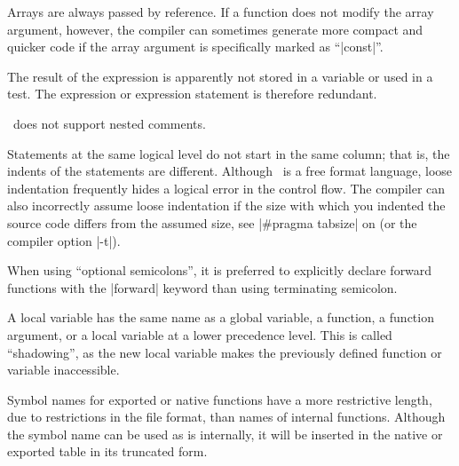 {{ 
        Arrays are always passed by reference. If a function does not modify
        the array argument, however, the compiler can sometimes generate more
        compact and quicker code if the array argument is specifically marked
        as ``|const|''.

 
        The result of the expression is apparently not stored in a variable
        or used in a test. The expression or expression statement is therefore
        redundant.

 
        \Small\ does not support nested comments.

 
        Statements at the same logical level do not start in the same column;
        that is, the indents of the statements are different. Although \Small\ is
        a free format language, loose indentation frequently hides a logical
        error in the control flow. \lbreak
        The compiler can also incorrectly assume loose indentation if the
         size with which you indented the source code differs
        from the assumed size, see |#pragma tabsize| on  (or
        the compiler option |-t|). %

 
        When using ``optional semicolons'', it is preferred to explicitly
        declare forward functions with the |forward| keyword than using
        terminating semicolon.

 
        A local variable has the same name as a global variable, a function, a
        function argument, or a local variable at a lower precedence level.
        This is called ``shadowing'', as the new local variable makes the
        previously defined function or variable inaccessible.

 
        Symbol names for exported or native functions have a more restrictive
        length, due to restrictions in the file format, than names of internal
        functions. Although the symbol name can be used as is internally, it
        will be inserted in the native or exported table in its truncated form.

}}
